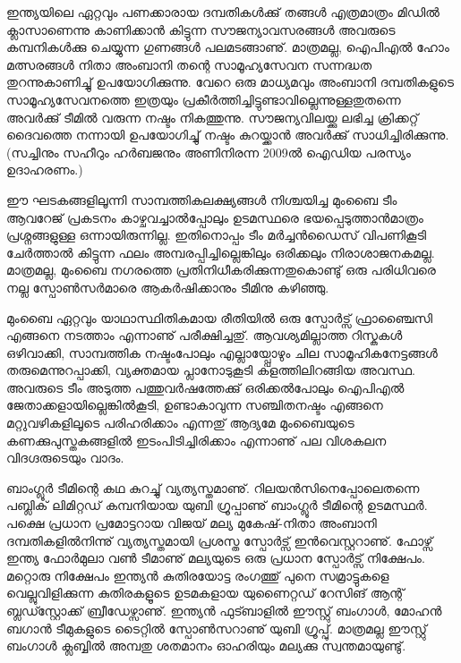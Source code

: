 ഇന്ത്യയിലെ ഏറ്റവും പണക്കാരായ ദമ്പതികള്‍ക്കു്  തങ്ങള്‍ എത്രമാത്രം മിഡില്‍ ക്ലാസാണെന്നു 
കാണിക്കാന്‍ കിട്ടുന്ന സൗജന്യാവസരങ്ങള്‍ അവരുടെ കമ്പനികള്‍ക്കു ചെയ്യുന്ന ഗുണങ്ങള്‍ പലമടങ്ങാണു്. മാത്രമല്ല, 
ഐപിഎല്‍ ഹോം മത്സരങ്ങള്‍ നിതാ അംബാനി തന്റെ സാമൂഹ്യസേവന സന്നദ്ധത തുറന്നുകാണിച്ചു് ഉപയോഗിക്കുന്നു. 
വേറെ ഒരു മാധ്യമവും അംബാനി ദമ്പതികളുടെ സാമൂഹ്യസേവനത്തെ ഇത്രയും പ്രകീര്‍ത്തിച്ചിട്ടുണ്ടാവില്ലെന്നുള്ളതുതന്നെ 
അവര്‍ക്കു് ടീമില്‍ വരുന്ന നഷ്ടം നികത്തുന്നു. സൗജന്യവിലയ്ക്കു ലഭിച്ച ക്രിക്കറ്റ് ദൈവത്തെ നന്നായി ഉപയോഗിച്ചു് 
നഷ്ടം കുറയ്ക്കാന്‍ അവര്‍ക്കു് സാധിച്ചിരിക്കുന്നു. (സച്ചിനും സഹീറും ഹര്‍ബജനും അണിനിരന്ന 2009ല്‍ ഐഡിയ പരസ്യം ഉദാഹരണം.)

ഈ ഘടകങ്ങളിലൂന്നി സാമ്പത്തികലക്ഷ്യങ്ങള്‍ നിശ്ചയിച്ച മുംബൈ ടീം ആവറേജ് പ്രകടനം കാഴ്ചവച്ചാല്‍പ്പോലും ഉടമസ്ഥരെ 
ഭയപ്പെടുത്താന്‍മാത്രം പ്രശ്നങ്ങളുള്ള ഒന്നായിരുന്നില്ല. ഇതിനൊപ്പം ടീം മര്‍ച്ചന്‍ഡൈസ് വിപണികൂടി ചേര്‍ത്താല്‍ കിട്ടുന്ന 
ഫലം അമ്പരപ്പിച്ചില്ലെങ്കിലും ഒരിക്കലും നിരാശാജനകമല്ല. മാത്രമല്ല, മുംബൈ നഗരത്തെ പ്രതിനിധീകരിക്കുന്നതുകൊണ്ടു് ഒരു 
പരിധിവരെ നല്ല സ്പോണ്‍സര്‍മാരെ ആകര്‍ഷിക്കാനും ടീമിനു കഴിഞ്ഞു.

മുംബൈ ഏറ്റവും യാഥാസ്ഥിതികമായ രീതിയില്‍ ഒരു സ്പോര്‍ട്സ് ഫ്രാഞ്ചൈസി എങ്ങനെ നടത്താം എന്നാണു് പരീക്ഷിച്ചതു്. 
ആവശ്യമില്ലാത്ത റിസ്കുകള്‍ ഒഴിവാക്കി, സാമ്പത്തിക നഷ്ടംപോലും എല്ലായ്പ്പോഴും ചില സാമൂഹികനേട്ടങ്ങള്‍ തരുമെന്നുറപ്പാക്കി, 
വ്യക്തമായ പ്ലാനോടുകൂടി കളത്തിലിറങ്ങിയ അവസ്ഥ. അവരുടെ ടീം അടുത്ത പത്തുവര്‍ഷത്തേക്കു് ഒരിക്കല്‍പോലും ഐപിഎല്‍ 
ജേതാക്കളായില്ലെങ്കില്‍കൂടി, ഉണ്ടാകാവുന്ന സഞ്ചിതനഷ്ടം എങ്ങനെ മറ്റുവഴികളിലൂടെ പരിഹരിക്കാം എന്നതു് ആദ്യമേ മുംബൈയുടെ 
കണക്കുപുസ്തകങ്ങളില്‍ ഇടംപിടിച്ചിരിക്കാം എന്നാണു് പല വിശകലന വിദഗ്ദരുടെയും വാദം.

ബാംഗ്ലൂര്‍ ടീമിന്റെ കഥ കുറച്ചു് വ്യത്യസ്തമാണു്. റിലയന്‍സിനെപ്പോലെതന്നെ പബ്ലിക് ലിമിറ്റഡ് കമ്പനിയായ യുബി ഗ്രൂപ്പാണു് 
ബാംഗ്ലൂര്‍ ടീമിന്റെ ഉടമസ്ഥര്‍. പക്ഷെ പ്രധാന പ്രമോട്ടറായ വിജയ് മല്യ മുകേഷ്-നിതാ അംബാനി ദമ്പതികളില്‍നിന്നു് 
വ്യത്യസ്തമായി പ്രശസ്ത സ്പോര്‍ട്സ് ഇന്‍വെസ്റ്ററാണു്. ഫോഴ്സ് ഇന്ത്യ ഫോര്‍മുലാ വണ്‍ ടീമാണു് മല്യയുടെ ഒരു പ്രധാന 
സ്പോര്‍ട്സ് നിക്ഷേപം. മറ്റൊരു നിക്ഷേപം ഇന്ത്യന്‍ കുതിരയോട്ട രംഗത്തു് പുനെ സമ്രാട്ടുകളെ വെല്ലുവിളിക്കുന്ന കുതിരകളൂടെ 
ഉടമകളായ യുണൈറ്റഡ് റേസിങ് ആന്റ് ബ്ലഡ്സ്റ്റോക്ക് ബ്രീഡേഴ്സാണു്. ഇന്ത്യന്‍ ഫുട്ബാളില്‍ ഈസ്റ്റു് ബംഗാള്‍, 
മോഹന്‍ ബഗാന്‍ ടീമുകളുടെ ടൈറ്റില്‍ സ്പോണ്‍സറാണു് യുബി ഗ്രൂപ്പു്. മാത്രമല്ല ഈസ്റ്റു് ബംഗാള്‍ ക്ലബ്ബില്‍ അമ്പതു 
ശതമാനം ഓഹരിയും മല്യക്കു സ്വന്തമായുണ്ടു്.


